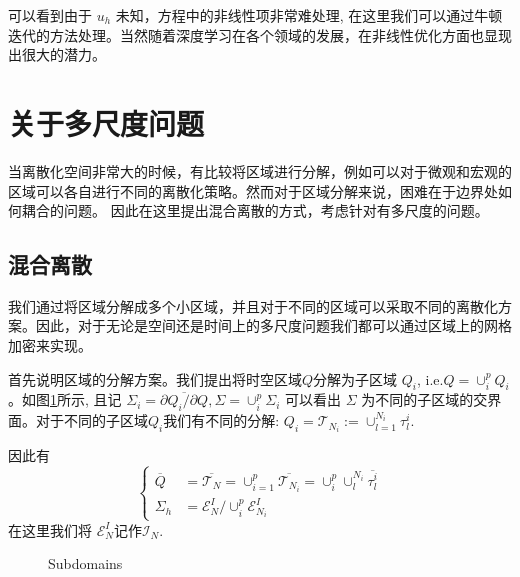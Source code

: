 可以看到由于 $u_h$ 未知，方程中的非线性项非常难处理, 在这里我们可以通过牛顿迭代的方法处理。当然随着深度学习在各个领域的发展，在非线性优化方面也显现出很大的潜力。

\section{关于多尺度问题}
当离散化空间非常大的时候，有比较将区域进行分解，例如可以对于微观和宏观的区域可以各自进行不同的离散化策略。然而对于区域分解来说，困难在于边界处如何耦合的问题。
因此在这里提出混合离散的方式，考虑针对有多尺度的问题。

\subsection{混合离散}
我们通过将区域分解成多个小区域，并且对于不同的区域可以采取不同的离散化方案。因此，对于无论是空间还是时间上的多尺度问题我们都可以通过区域上的网格加密来实现。

首先说明区域的分解方案。我们提出将时空区域$Q$分解为子区域 $Q_i$, i.e.$Q=\cup_i^pQ_i$。如图\ref{subdomain}所示, 
且记 $\Sigma_i=\overline{\partial Q_i/\partial Q},\Sigma=\cup_i^p \Sigma_i$
可以看出 $\Sigma$ 为不同的子区域的交界面。对于不同的子区域$Q_i$我们有不同的分解: $Q_i=\mathscr{T}_{N_i}:=\cup_{l=1}^{N_i}\tau_l^i$. 

因此有
$$\left\{
    \begin{aligned}
        \overline{Q}&=\overline{\mathscr{T}_N}=\cup_{i=1}^p\overline{\mathscr{T}_{N_i}}=\cup_i^p\cup_l^{N_i}\overline{\tau_l^i}\\
        \Sigma_h&=\mathscr{E}_N^I/ \cup_i^p\mathscr{E}_{N_i}^I
    \end{aligned}\right.$$
在这里我们将 $\mathscr{E}_N^I$记作$\mathcal{I}_N$.

\begin{figure}[H]
    \begin{center}
    \end{center}
    \caption{Subdomains}
    \label{subdomain}
\end{figure}

